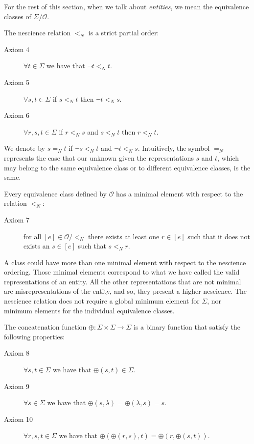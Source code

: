 For the rest of this section, when we talk about \emph{entities}, we mean the equivalence classes of $\Sigma / \mathcal{O}$.

The nescience relation $<_N$ is a strict partial order:

\vskip 0.25cm

\begin{description}
\item[Axiom 4] $\forall t \in \Sigma$ we have that $\lnot t <_N t$.
\item[Axiom 5] $\forall s , t \in \Sigma$ if $s <_N t$ then $\lnot t <_N s$.
\item[Axiom 6] $\forall r , s, t \in \Sigma$ if $r <_N s$ and $s <_N t$ then $r <_N t$.
\end{description}

\vskip 0.25cm

We denote by $ s =_N t$ if $\lnot s <_N t$ and $\lnot t <_N s$. Intuitively, the symbol $=_N$ represents the case that our unknown given the representations $s$ and $t$, which may belong to the same equivalence class or to different equivalence classes, is the same. 

Every equivalence class defined by $\mathcal{O}$ has a minimal element with respect to the relation $<_N$:

\vskip 0.25cm

\begin{description}
\item[Axiom 7] for all $[e] \in \mathcal{O} / <_N$ there exists at least one $r \in [e]$ such that it does not exists an $s \in [e]$ such that $s <_N r$.
\end{description}

\vskip 0.25cm

A class could have more than one minimal element with respect to the nescience ordering. Those minimal elements correspond to what we have called the valid representations of an entity. All the other representations that are not minimal are misrepresentations of the entity, and so, they present a higher nescience. The nescience relation does not require a global minimum element for $\Sigma$, nor minimum elements for the individual equivalence classes.

The concatenation function $\oplus : \Sigma \times \Sigma \rightarrow \Sigma$ is a binary function that satisfy the following properties:

\vskip 0.25cm

\begin{description}
\item[Axiom 8] $\forall s, t \in \Sigma$ we have that $\oplus(s, t) \in \Sigma$.
\item[Axiom 9] $\forall s \in \Sigma$ we have that $\oplus(s, \lambda) = \oplus( \lambda, s) = s$.
\item[Axiom 10] $\forall r, s, t \in \Sigma$ we have that $\oplus(\oplus(r, s), t) = \oplus(r, \oplus(s, t))$.
\end{description}

